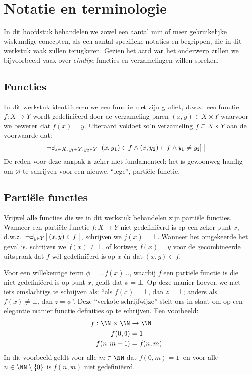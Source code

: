 \chapter{Notatie en terminologie}

In dit hoofdstuk behandelen we zowel een aantal min of meer gebruikelijke wiskundige concepten, als een aantal specifieke notaties en begrippen, die in dit werkstuk vaak zullen terugkeren. Gezien het aard van het onderwerp zullen we bijvoorbeeld vaak over \emph{eindige} functies en verzamelingen willen spreken.

\section{Functies}

In dit werkstuk identificeren we een functie met zijn grafiek, d.w.z.~een functie $f : X \to Y$ wordt gedefiniëerd door de verzameling paren $(x, y) \in X \times Y$ waarvoor we beweren dat $f(x) = y$. Uiteraard voldoet zo'n verzameling $f \subseteq X \times Y$ aan de voorwaarde dat: $$ \neg \exists_{x \in X,\, y_1 \in Y,\, y_2 \in Y} \big[\, (x, y_1) \in f \land (x, y_2) \in f \land y_1 \neq y_2 ] \,\big] $$ De reden voor deze aanpak is zeker niet fundamenteel: het is gewoonweg handig om $\varnothing$ te schrijven voor een nieuwe, ``lege'', partiële functie.

\section{Partiële functies}

Vrijwel alle functies die we in dit werkstuk behandelen zijn partiële functies. Wanneer een partiële functie $f : X \to Y$ niet gedefiniëerd is op een zeker punt $x$, d.w.z.~$\neg \exists_{y \in Y} \big[\, (x, y) \in f \,\big]$, schrijven we $f(x) = \bot$. Wanneer het omgekeerde het geval is, schrijven we $f(x) \neq \bot$, of kortweg $f(x) = y$ voor de gecombineerde uitspraak dat $f$ wél gedefiniëerd is op $x$ én dat $(x, y) \in f$.

Voor een willekeurige term $\phi = \dots f(x)\dots$, waarbij $f$ een partiële functie is die niet gedefiniëerd is op punt $x$, geldt dat $\phi = \bot$. Op deze manier hoeven we niet iets omslachtigs te schrijven als: ``als $f(x) = \bot$, dan $z = \bot$; anders als $f(x) \neq \bot$, dan $z = \phi$''. Deze ``verkote schrijfwijze'' stelt ons in staat om op een elegantie manier functie definities op te schrijven. Een voorbeeld:
%
\begin{align*}
  f : \NN \times \NN &\to \NN \\
  f(0, 0) &= 1 \\
  f(n, m + 1) &= f(n, m)
\end{align*}
%
In dit voorbeeld geldt voor alle $m \in \NN$ dat $f(0, m) = 1$, en voor alle $n \in \NN \setminus \{0\}$ is $f(n, m)$ niet gedefiniëerd.

